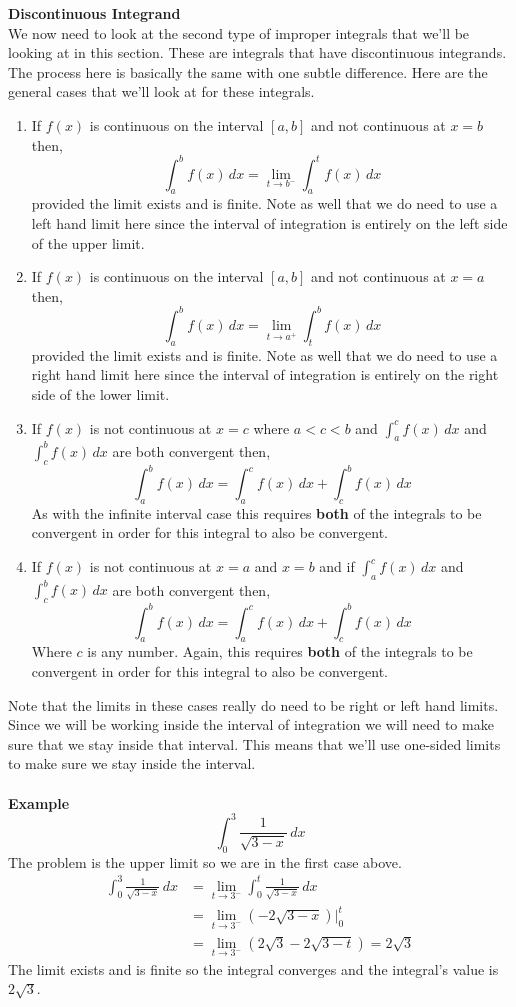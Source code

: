 \documentclass[10pt,reqno]{book}
\theoremstyle{definition}
\begin{document}
 	\noindent \textbf{Discontinuous Integrand}\\
 	We now need to look at the second type of improper integrals that we'll be looking at in this section. These are integrals that have discontinuous integrands. The process here is basically the same with one subtle difference. Here are the general cases that we'll look at for these integrals.
 	\begin{enumerate}
 		\item If $ f(x) $ is continuous on the interval $ [a,b] $ and not continuous at $ x = b $ then,
 			\[ \int_a^b f(x)\,dx = \lim\limits_{t \to b^-} \int_a^t f(x)\,dx \]
 			provided the limit exists and is finite. Note as well that we do need to use a left hand limit here since the interval of integration is entirely on the left side of the upper limit.
 			
 		\item If $ f(x) $ is continuous on the interval $ [a,b] $ and not continuous at $ x = a $ then,
 			\[ \int_a^b f(x)\,dx = \lim\limits_{t \to a^+} \int_t^b f(x)\,dx \]
 			provided the limit exists and is finite. Note as well that we do need to use a right hand limit here since the interval of integration is entirely on the right side of the lower limit.
 		
 		\item If $ f(x) $ is not continuous at $ x = c $ where $ a < c < b $ and $ \int_a^c f(x)\,dx $ and $ \int_c^b f(x)\,dx $ are both convergent then,
 			\[ \int_a^b f(x)\,dx = \int_a^c f(x)\,dx + \int_c^b f(x)\,dx \]
 			As with the infinite interval case this requires \textbf{both} of the integrals to be convergent in order for this integral to also be convergent.
 			
 		\item If $ f(x) $ is not continuous at $ x = a $ and $ x = b $ and if $ \int_a^c f(x)\,dx $ and $ \int_c^b f(x)\,dx $ are both convergent then,
 		\[ \int_a^b f(x)\,dx = \int_a^c f(x)\,dx + \int_c^b f(x)\,dx \]
 		Where $ c $ is any number. Again, this requires \textbf{both} of the integrals to be convergent in order for this integral to also be convergent.
 	\end{enumerate}
 	Note that the limits in these cases really do need to be right or left hand limits. Since we will be working inside the interval of integration we will need to make sure that we stay inside that interval. This means that we'll use one-sided limits to make sure we stay inside the interval.\\ \\
 	\textbf{Example}
 	\[ \int_0^3 \frac{1}{\sqrt{3-x}}\,dx \]
	The problem is the upper limit so we are in the first case above.
	\begin{align*}
		\int_0^3 \frac{1}{\sqrt{3-x}}\,dx &= \lim\limits_{t \to 3^-} \int_0^t \frac{1}{\sqrt{3-x}}\,dx\\
		&= \lim\limits_{t \to 3^-} (-2\sqrt{3-x})\Big|_0^t\\
		&= \lim\limits_{t \to 3^-} (2\sqrt{3} - 2\sqrt{3-t}) = 2\sqrt{3}
	\end{align*}
	The limit exists and is finite so the integral converges and the integral's value is $ 2\sqrt{3} $.
\end{document}
